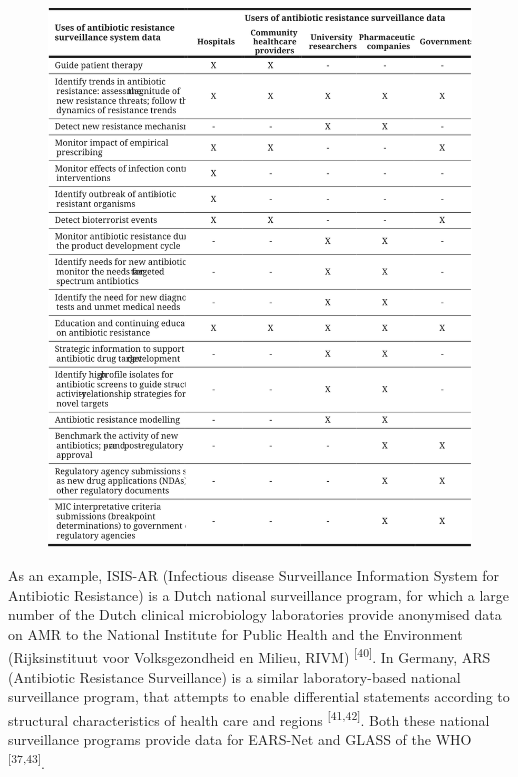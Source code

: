 \documentclass[
]{book}
\begin{document}
\begin{figure}

{\centering \includegraphics[width=1\linewidth]{images/01-t01} 

}

\end{figure}

As an example, ISIS-AR (Infectious disease Surveillance Information System for Antibiotic Resistance) is a Dutch national surveillance program, for which a large number of the Dutch clinical microbiology laboratories provide anonymised data on AMR to the National Institute for Public Health and the Environment (Rijksinstituut voor Volksgezondheid en Milieu, RIVM) \textsuperscript{{[}40{]}}. In Germany, ARS (Antibiotic Resistance Surveillance) is a similar laboratory-based national surveillance program, that attempts to enable differential statements according to structural characteristics of health care and regions \textsuperscript{{[}41,42{]}}. Both these national surveillance programs provide data for EARS-Net and GLASS of the WHO \textsuperscript{{[}37,43{]}}.
\end{document}
